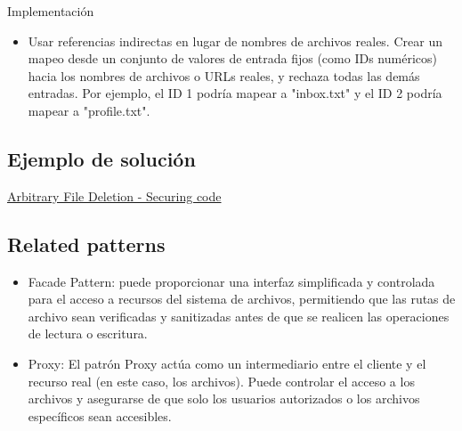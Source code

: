 Implementación
\begin{itemize}
    \item Usar referencias indirectas en lugar de nombres de archivos reales. Crear un mapeo desde un conjunto de valores de entrada fijos (como IDs numéricos) hacia los nombres de archivos o URLs reales, y rechaza todas las demás entradas. Por ejemplo, el ID 1 podría mapear a "inbox.txt" y el ID 2 podría mapear a "profile.txt". 
\end{itemize}

\subsection*{Ejemplo de solución}
\href{https://patchstack.com/academy/wordpress/securing-code/arbitrary-file-deletion/}{Arbitrary File Deletion - Securing code}
\subsection*{Related patterns}
\begin{itemize}
    \item Facade Pattern: puede proporcionar una interfaz simplificada y controlada para el acceso
    a recursos del sistema de archivos, permitiendo que las rutas de archivo sean verificadas
    y sanitizadas antes de que se realicen las operaciones de lectura o escritura.
    \item Proxy: El patrón Proxy actúa como un intermediario entre el cliente y el recurso real (en este caso, los archivos). Puede controlar el acceso a los archivos y asegurarse de que solo los usuarios autorizados o los archivos específicos sean accesibles.
\end{itemize}

